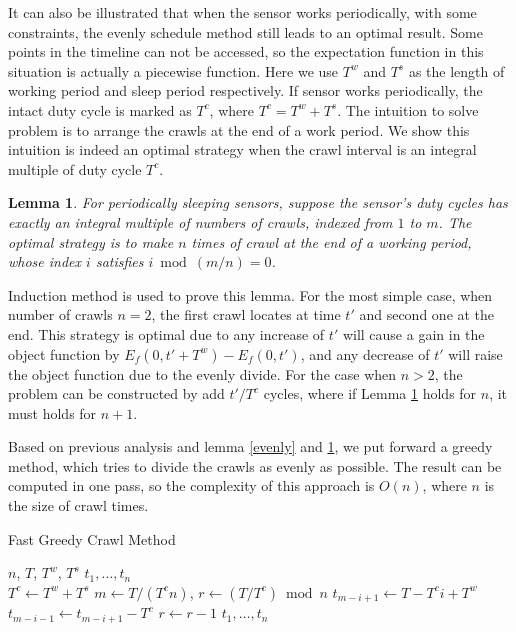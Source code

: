 \documentclass[conference]{IEEEtran}
\newtheorem{lemma}{Lemma}
\begin{document}
It can also be illustrated that when the sensor works periodically, with some constraints, the evenly schedule method still leads to an optimal result.
Some points in the timeline can not be accessed, so the expectation function in this situation is actually a piecewise function.
Here we use $T^{w}$ and $T^{s}$ as the length of working period and sleep period respectively.
If sensor works periodically, the intact duty cycle is marked as $T^{c}$, where $T^{c}=T^{w}+T^{s}$.
The intuition to solve problem is to arrange the crawls at the end of a work period.
We show this intuition is indeed an optimal strategy when the crawl interval is an integral multiple of duty cycle $T^{c}$.
\begin{lemma}
\label{evenly_s}
For periodically sleeping sensors, suppose the sensor's duty cycles has exactly an integral multiple of numbers of crawls, indexed from $1$ to $m$.
The optimal strategy is to make $n$ times of crawl at the end of a working period, whose index $i$ satisfies $i \bmod (m/n)=0$.
\end{lemma}
\begin{IEEEproof}
Induction method is used to prove this lemma.
For the most simple case, when number of crawls $n=2$, the first crawl locates at time $t'$ and second one at the end. 
This strategy is optimal due to any increase of $t'$ will cause a gain in the object function by $E_f(0,t'+T^{w})-E_f(0,t')$, and any decrease of $t'$ will raise the object function due to the evenly divide.
For the case when $n>2$, the problem can be constructed by add $t'/T^{c}$ cycles, where if Lemma \ref{evenly_s} holds for $n$, it must holds for $n+1$.
\end{IEEEproof}

Based on previous analysis and lemma \ref{evenly} and \ref{evenly_s}, we put forward a greedy method, which tries to divide the crawls as evenly as possible. 
The result can be computed in one pass, so the complexity of this approach is $O(n)$, where $n$ is the size of crawl times.
\begin{algorithm}
	\caption{Fast Greedy Crawl Method}
	\begin{algorithmic}[1]
		\renewcommand{\algorithmicrequire}{\textbf{Input:}}
		\renewcommand{\algorithmicensure}{\textbf{Output:}}
		\REQUIRE $n$, $T$, $T^w$, $T^s$
		\ENSURE  $t_1,\ldots,t_n$
		\\ 
		\STATE $T^{c} \gets T^{w}+T^{s}$
		\STATE $m \gets T/(T^{c} n)$, $r\gets (T/T^{c})\bmod{n}$
		\STATE $t_{m-i+1}\gets T- T^{c} i + T^{w}$
		\STATE $t_{m-i-1}\gets t_{m-i+1}-T^{c}$
		\STATE $r\gets r-1$
		\ENDIF
		\ENDFOR
		\RETURN $t_1,\ldots,t_n$
	\end{algorithmic} 
\end{algorithm}
\end{document}
